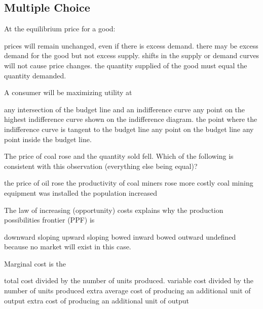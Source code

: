\begin{questions}

  \section{Multiple Choice}

  \question[2] At the equilibrium price for a good:
  \begin{choices}
    \choice prices will remain unchanged, even if there is excess
    demand.
    \choice there may be excess demand for the good but not excess
    supply.
    \choice shifts in the supply or demand curves will not cause price
    changes.
    \CorrectChoice the quantity supplied of the good must equal the
    quantity demanded.
  \end{choices}

  \question[2] A consumer will be maximizing utility at
  \begin{choices}
    \choice any intersection of the budget line and an indifference
    curve
    \choice any point on the highest indifference curve shown on the
    indifference diagram.
    \CorrectChoice the point where the indifference curve is tangent
    to the budget line
    \choice any point on the budget line
    \choice any point inside the budget line.
  \end{choices}

  \question[2] The price of coal rose and the quantity sold
  fell. Which of the following is consistent with this observation
  (everything else being equal)?
  \begin{choices}
    \choice the price of oil rose
    \choice the productivity of coal miners rose
    \CorrectChoice more costly coal mining equipment was installed
    \choice the population increased
  \end{choices}

  \question[2] The law of increasing (opportunity) costs explains why
  the production possibilities frontier  (PPF) is
  \begin{choices}
    \choice downward sloping
    \choice upward sloping
    \choice bowed inward
    \CorrectChoice bowed outward
    \choice undefined because no market will exist in this case.
  \end{choices}

  \question[2] Marginal cost is the
  \begin{choices}
    \choice total cost divided by the number of units produced.
    \choice variable cost divided by the number of units produced
    \choice extra average cost of producing an additional unit of
    output
    \CorrectChoice extra cost of producing an additional unit of
    output
  \end{choices}


\end{questions}

